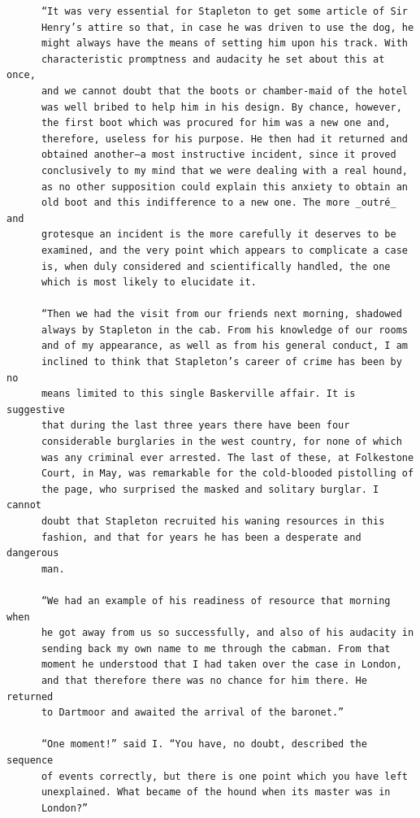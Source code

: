 \documentclass{article}
\begin{document}
\begin{verbatim}
      “It was very essential for Stapleton to get some article of Sir
      Henry’s attire so that, in case he was driven to use the dog, he
      might always have the means of setting him upon his track. With
      characteristic promptness and audacity he set about this at once,
      and we cannot doubt that the boots or chamber-maid of the hotel
      was well bribed to help him in his design. By chance, however,
      the first boot which was procured for him was a new one and,
      therefore, useless for his purpose. He then had it returned and
      obtained another—a most instructive incident, since it proved
      conclusively to my mind that we were dealing with a real hound,
      as no other supposition could explain this anxiety to obtain an
      old boot and this indifference to a new one. The more _outré_ and
      grotesque an incident is the more carefully it deserves to be
      examined, and the very point which appears to complicate a case
      is, when duly considered and scientifically handled, the one
      which is most likely to elucidate it.

      “Then we had the visit from our friends next morning, shadowed
      always by Stapleton in the cab. From his knowledge of our rooms
      and of my appearance, as well as from his general conduct, I am
      inclined to think that Stapleton’s career of crime has been by no
      means limited to this single Baskerville affair. It is suggestive
      that during the last three years there have been four
      considerable burglaries in the west country, for none of which
      was any criminal ever arrested. The last of these, at Folkestone
      Court, in May, was remarkable for the cold-blooded pistolling of
      the page, who surprised the masked and solitary burglar. I cannot
      doubt that Stapleton recruited his waning resources in this
      fashion, and that for years he has been a desperate and dangerous
      man.

      “We had an example of his readiness of resource that morning when
      he got away from us so successfully, and also of his audacity in
      sending back my own name to me through the cabman. From that
      moment he understood that I had taken over the case in London,
      and that therefore there was no chance for him there. He returned
      to Dartmoor and awaited the arrival of the baronet.”

      “One moment!” said I. “You have, no doubt, described the sequence
      of events correctly, but there is one point which you have left
      unexplained. What became of the hound when its master was in
      London?”


\end{verbatim}
\end{document}
